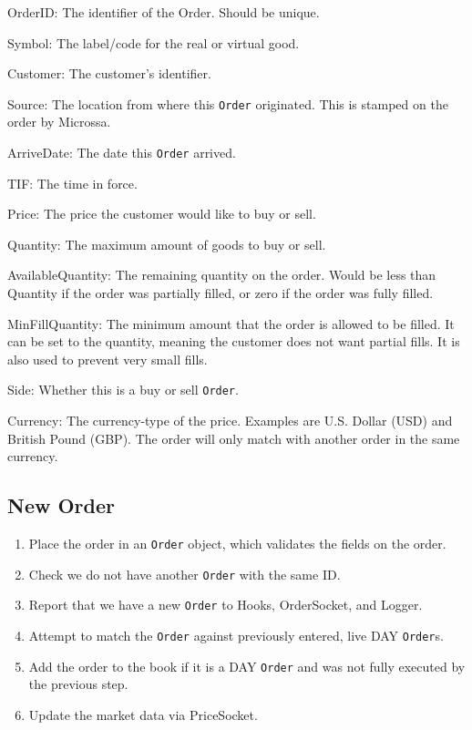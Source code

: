 \documentclass[Letter]{article}
\begin{document}
\begin{description}
    \item{OrderID:} The identifier of the Order.  Should be unique.
    \item{Symbol:} The label/code for the real or virtual good.
    \item{Customer:} The customer's identifier.
    \item{Source:} The location from where this \texttt{Order} originated.
    This is stamped on the order by Microssa.
    \item{ArriveDate:} The date this \texttt{Order} arrived.
    \item{TIF:} The time in force.
    \item{Price:} The price the customer would like to buy or sell.
    \item{Quantity:} The maximum amount of goods to buy or sell.
    \item{AvailableQuantity:} The remaining quantity on the order.
    Would be less than Quantity if the order was partially filled, or
    zero if the order was fully filled.
    \item{MinFillQuantity:} The minimum amount that the order is
    allowed to be filled.  It can be set to the quantity, meaning the
    customer does not want partial fills.  It is also used to prevent
    very small fills.
    \item{Side:} Whether this is a buy or sell \texttt{Order}.
    \item{Currency:} The currency-type of the price.  Examples are
    U.S. Dollar (USD) and British Pound (GBP).  The order will only
    match with another order in the same currency.
\end{description}

\subsection{New Order}

\begin{enumerate}
    \item Place the order in an \texttt{Order} object, which validates
    the fields on the order.
    \item Check we do not have another \texttt{Order} with the same ID.
    \item Report that we have a new \texttt{Order} to Hooks, OrderSocket,
    and Logger.
    \item Attempt to match the \texttt{Order} against previously entered,
    live DAY \texttt{Order}s.
    \item Add the order to the book if it is a DAY \texttt{Order} and
    was not fully executed by the previous step.
    \item Update the market data via PriceSocket.
\end{enumerate}
\end{document}
